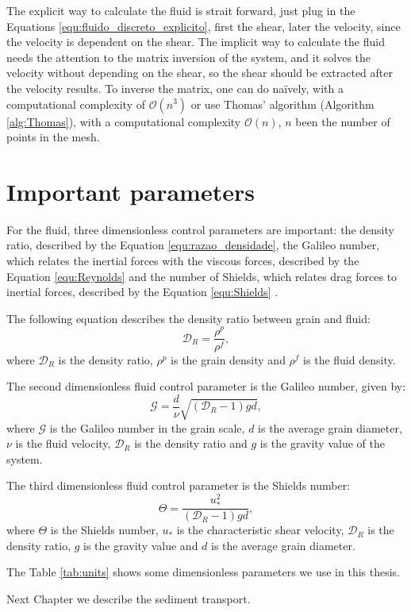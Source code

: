 

    The explicit way to calculate the fluid is strait forward, just plug in the Equations \ref{equ:fluido_discreto_explicito}, first the shear, later the velocity, since the velocity is dependent on the shear. The implicit way to calculate the fluid needs the attention to the matrix inversion of the system, and it solves the velocity without depending on the shear, so the shear should be extracted after the velocity results. To inverse the matrix, one can do naïvely, with a computational complexity of $\mathcal{O}(n^3)$ or use Thomas' algorithm (Algorithm \ref{alg:Thomas}), with a computational complexity $\mathcal{O}(n)$, $n$ been the number of points in the mesh.



\section{Important parameters}
    For the fluid, three dimensionless control parameters are important: the density ratio, described by the Equation \ref{equ:razao_densidade}, the Galileo number, which relates the inertial forces with the viscous forces, described by the Equation \ref{equ:Reynolds} and the number of Shields, which relates drag forces to inertial forces, described by the Equation \ref{equ:Shields} \cite{Numerical_simulation_of_turbulent_sediment_transport}.

    The following equation describes the density ratio between grain and fluid:
\begin{equation}
    \label{equ:razao_densidade}
    \mathcal{D}_{R} = \frac{\rho^{p}}{\rho^{f}},
\end{equation}
where $\mathcal{D}_{R}$ is the density ratio, $\rho^{p}$ is the grain density and $\rho^f$ is the fluid density.

    The second dimensionless fluid control parameter is the Galileo number, given by:
\begin{equation}
    \label{equ:Reynolds}
    \mathcal{G} = \frac{d}{\nu}\sqrt{\left(\mathcal{D}_{R}-1\right)gd},
\end{equation}
where $\mathcal{G}$ is the Galileo number in the grain scale, $d$ is the average grain diameter, $\nu$ is the fluid velocity, $\mathcal{D}_{R}$ is the density ratio and $g$ is the gravity value of the system.

    The third dimensionless fluid control parameter is the Shields number:
\begin{equation}
    \label{equ:Shields}
    \Theta = \frac{u_{*}^{2}}{\left(\mathcal{D}_{R}-1\right)gd},
\end{equation}
where $\Theta$ is the Shields number, $u_{*}$ is the characteristic shear velocity, $\mathcal{D}_{R}$ is the density ratio, $g$ is the gravity value and $d$ is the average grain diameter.

    The Table \ref{tab:units} shows some dimensionless parameters we use in this thesis.



    Next Chapter we describe the sediment transport.

